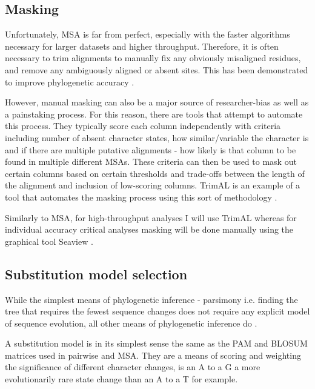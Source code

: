 
\subsection{Masking}

Unfortunately, MSA is far from perfect, especially with the faster algorithms 
necessary for larger datasets and higher throughput.  Therefore,
it is often necessary to trim alignments to manually fix any obviously 
misaligned residues, and remove any ambiguously aligned or absent sites.
This has been demonstrated to improve phylogenetic accuracy \citep{Talavera2007}.


However, manual masking can also be a major source of researcher-bias as well
as a painstaking process.  For this reason, there are tools that attempt to 
automate this process.   They typically score each column independently with
criteria including number of absent character states, how similar/variable the
character is and if there are multiple putative alignments - how likely is
that column to be found in multiple different MSAs.
These criteria can then be used to mask out certain columns based on certain
thresholds and trade-offs between the length of the alignment and inclusion
of low-scoring columns.  
TrimAL is an example of a tool that automates the masking process
using this sort of methodology \citep{Capella-Gutierrez2009}.  

Similarly to MSA, for high-throughput analyses I will use TrimAL 
whereas for individual accuracy critical analyses masking will be done
manually using the graphical tool Seaview \citep{Gouy2010}.




\subsection{Substitution model selection}

While the simplest means of phylogenetic inference - parsimony i.e. finding
the tree that requires the fewest sequence changes does not require any explicit
model of sequence evolution, all other means of phylogenetic inference do \citep{Le2008}.


A substitution model is in its simplest sense the same as the PAM and BLOSUM
matrices used in pairwise and MSA.  They are a means of scoring and weighting
the significance of different character changes, is an A to a G a more evolutionarily
rare state change than an A to a T for example.

